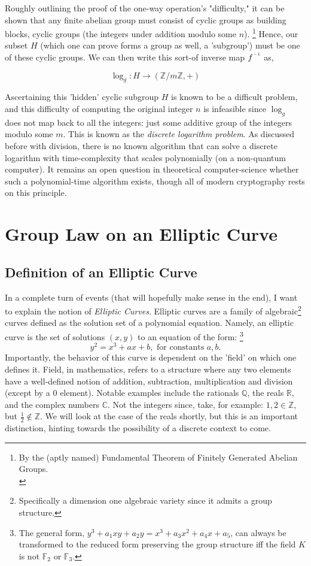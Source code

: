 \documentclass[11pt, a4paper]{report}
\newcommand{\inv}{^{\raisebox{.2em}{$\scriptscriptstyle-1$}}}
\newcommand{\integers}{\mathbb{Z}}
\newcommand{\rationals}{\mathbb{Q}}
\newcommand{\reals}{\mathbb{R}}
\newcommand{\complexes}{\mathbb{C}}
\newcommand{\field}{\mathbb{F}}
\begin{document}
Roughly outlining the proof of the one-way operation's "difficulty," it can be shown that any finite abelian group must consist of cyclic groups as building blocks, cyclic groups (the integers under addition modulo some $n$). \footnote{By the (aptly named) Fundamental Theorem of Finitely Generated Abelian Groups. \\\autocite[134]{saracino}} Hence, our subset $H$ (which one can prove forms a group as well, a 'subgroup')\autocite[43]{koblitz} must be one of these cyclic groups. We can then write this sort-of inverse map $f\inv$ as,

\[ \log_g : H \rightarrow (\integers / m \integers, +) \]

Ascertaining this 'hidden' cyclic subgroup $H$ is known to be a difficult problem, and this difficulty of computing the original integer $n$ is infeasible since $\log_g$ does not map back to all the integers: just some additive group of the integers modulo some $m$. This is known as the \textit{discrete logarithm problem}.\autocite[97]{koblitz} As discussed before with division, there is no known algorithm that can solve a discrete logarithm with time-complexity that scales polynomially (on a non-quantum computer). It remains an open question in theoretical computer-science whether such a polynomial-time algorithm exists, though all of  modern cryptography rests on this principle.\autocite{lomont}


\section{Group Law on an Elliptic Curve}
\subsection{Definition of an Elliptic Curve}
In a complete turn of events (that will hopefully make sense in the end), I want to explain the notion of \textit{Elliptic Curves}. Elliptic curves are a family of  algebraic\footnote{Specifically a dimension one algebraic variety since it admits a group structure.} curves defined as the solution set of a polynomial equation. Namely, an elliptic curve is the set of solutions $(x,y)$ to an equation of the form:\autocite[10]{koblitz} \footnote{The general form, $y^3 + a_1xy + a_2y = x^3 + a_3x^2 + a_4x + a_5$, can always be transformed to the reduced form preserving the group structure iff the field $K$ is not $\field_2$ or $\field_3$.}
\[y^2 = x^3 + ax + b, \text{ for constants } a,b.\]
Importantly, the behavior of this curve is dependent on the 'field' on which one defines it. Field, in mathematics, refers to a structure where any two elements have a well-defined notion of addition, subtraction, multiplication and division (except by a 0 element). Notable examples include the rationals $\rationals$, the reals $\reals$, and the complex numbers $\complexes$. Not the integers since, take, for example: $1, 2 \in \integers$, but $\frac{1}{2} \notin \integers$. We will look at the case of the reals shortly, but this is an important distinction, hinting towards the possibility of a discrete context to come.
\end{document}

